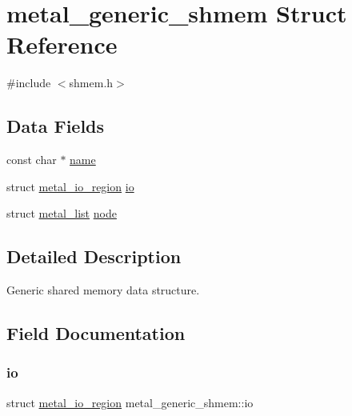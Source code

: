 \hypertarget{structmetal__generic__shmem}{}\section{metal\+\_\+generic\+\_\+shmem Struct Reference}
\label{structmetal__generic__shmem}


{\ttfamily \#include $<$shmem.\+h$>$}

\subsection*{Data Fields}
\begin{DoxyCompactItemize}
\item 
const char $\ast$ \hyperlink{structmetal__generic__shmem_a304ef67e964e7ba1e9a8e3034272ce98}{name}
\item 
struct \hyperlink{structmetal__io__region}{metal\+\_\+io\+\_\+region} \hyperlink{structmetal__generic__shmem_a9ff465930b0c32e79176b4598aa96e4a}{io}
\item 
struct \hyperlink{structmetal__list}{metal\+\_\+list} \hyperlink{structmetal__generic__shmem_ad944a8261f79fa83d29c9d7cfd7b2103}{node}
\end{DoxyCompactItemize}


\subsection{Detailed Description}
Generic shared memory data structure. 

\subsection{Field Documentation}
\mbox{\label{structmetal__generic__shmem_a9ff465930b0c32e79176b4598aa96e4a}} 
\subsubsection{\texorpdfstring{io}{io}}
{\footnotesize\ttfamily struct \hyperlink{structmetal__io__region}{metal\+\_\+io\+\_\+region} metal\+\_\+generic\+\_\+shmem\+::io}

\mbox{\label{structmetal__generic__shmem_a304ef67e964e7ba1e9a8e3034272ce98}} 
